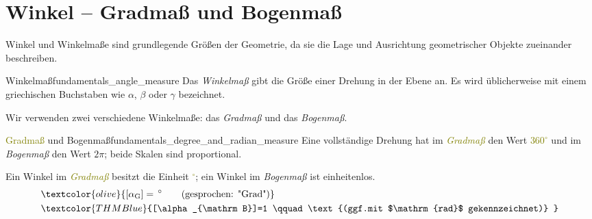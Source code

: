\section{Winkel -- Gradmaß und Bogenmaß}
\label{sec:fundamentals_angle_measures}

Winkel und Winkelmaße sind grundlegende Größen der Geometrie, da sie die Lage und
Ausrichtung geometrischer Objekte zueinander beschreiben.

\begin{DefinitionBox}{Winkelmaß}{fundamentals_angle_measure}
  Das \emph{Winkelmaß}  gibt die Größe einer Drehung in der Ebene an.
  Es wird üblicherweise mit einem griechischen Buchstaben wie $\alpha$, $\beta$ oder $\gamma$ bezeichnet.

  \begin{center}
  \end{center}
\end{DefinitionBox}

Wir verwenden zwei verschiedene Winkelmaße: das \emph{Gradmaß} und das \emph{Bogenmaß}.

\begin{DefinitionBox}{\textcolor{olive}{Gradmaß} und
    \textcolor{THMBlue}{Bogenmaß}}{fundamentals_degree_and_radian_measure}
  Eine vollständige Drehung hat im \textcolor{olive}{\emph{Gradmaß}}
   den Wert \textcolor{olive}{$360^\circ$} und im
  \textcolor{THMBlue}{\emph{Bogenmaß}}  den Wert
  \textcolor{THMBlue}{$2\pi$}; beide Skalen sind proportional.

  \begin{center}
  \end{center}

  Ein Winkel im \textcolor{olive}{\emph{Gradmaß}} besitzt die Einheit
  \textcolor{olive}{$^\circ$}; ein Winkel im
  \textcolor{THMBlue}{\emph{Bogenmaß}} ist einheitenlos.
  \begin{align*}
    &\textcolor{olive}{[\alpha_{\mathrm G}]=\,{}^\circ   \qquad \text{(gesprochen: "Grad")} } \\
    &\textcolor{THMBlue}{[\alpha_{\mathrm B}]=1          \qquad \text{(ggf.mit $\mathrm{rad}$ gekennzeichnet)} }
  \end{align*}
\end{DefinitionBox}

